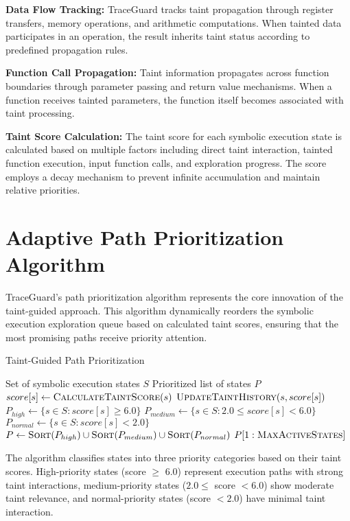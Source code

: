 \textbf{Data Flow Tracking:} TraceGuard tracks taint propagation through register transfers, memory operations, and arithmetic computations. When tainted data participates in an operation, the result inherits taint status according to predefined propagation rules.

\textbf{Function Call Propagation:} Taint information propagates across function boundaries through parameter passing and return value mechanisms. When a function receives tainted parameters, the function itself becomes associated with taint processing.

\textbf{Taint Score Calculation:} The taint score for each symbolic execution state is calculated based on multiple factors including direct taint interaction, tainted function execution, input function calls, and exploration progress. The score employs a decay mechanism to prevent infinite accumulation and maintain relative priorities.

\section{Adaptive Path Prioritization Algorithm}

TraceGuard's path prioritization algorithm represents the core innovation of the taint-guided approach. This algorithm dynamically reorders the symbolic execution exploration queue based on calculated taint scores, ensuring that the most promising paths receive priority attention.

\begin{algorithm}
\caption{Taint-Guided Path Prioritization}
\begin{algorithmic}[1]
\Require Set of symbolic execution states $S$
\Ensure Prioritized list of states $P$
    \State $score[s] \gets \textsc{CalculateTaintScore}(s)$
    \State $\textsc{UpdateTaintHistory}(s, score[s])$
\EndFor
\State $P_{high} \gets \{s \in S : score[s] \geq 6.0\}$
\State $P_{medium} \gets \{s \in S : 2.0 \leq score[s] < 6.0\}$
\State $P_{normal} \gets \{s \in S : score[s] < 2.0\}$
\State $P \gets \textsc{Sort}(P_{high}) \cup \textsc{Sort}(P_{medium}) \cup \textsc{Sort}(P_{normal})$
\State \Return $P[1:\textsc{MaxActiveStates}]$
\end{algorithmic}
\end{algorithm}

The algorithm classifies states into three priority categories based on their taint scores. High-priority states (score $\geq$ 6.0) represent execution paths with strong taint interactions, medium-priority states ($2.0 \leq$ score $< 6.0$) show moderate taint relevance, and normal-priority states (score $< 2.0$) have minimal taint interaction.

